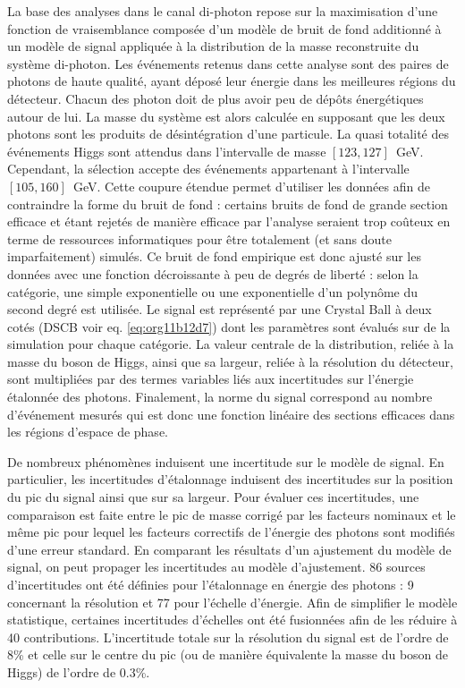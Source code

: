 La base des analyses dans le canal di-photon repose sur la maximisation d'une fonction de vraisemblance composée d'un modèle de bruit de fond additionné à un modèle de signal appliquée à la distribution de la masse reconstruite du système di-photon.
Les événements retenus dans cette analyse sont des paires de photons de haute qualité, ayant déposé leur énergie dans les meilleures régions du détecteur.
Chacun des photon doit de plus avoir peu de dépôts énergétiques autour de lui.
La masse du système est alors calculée en supposant que les deux photons sont les produits de désintégration d'une particule.
La quasi totalité des événements Higgs sont attendus dans l'intervalle de masse $[123, 127]$~GeV.
Cependant, la sélection accepte des événements appartenant à l'intervalle $[105, 160]$~GeV.
Cette coupure étendue permet d'utiliser les données afin de contraindre la forme du bruit de fond : certains bruits de fond de grande section efficace et étant rejetés de manière efficace par l'analyse seraient trop coûteux en terme de ressources informatiques pour être totalement (et sans doute imparfaitement) simulés.
Ce bruit de fond empirique est donc ajusté sur les données avec une fonction décroissante à peu de degrés de liberté : selon la catégorie, une simple exponentielle ou une exponentielle d'un polynôme du second degré est utilisée.
Le signal est représenté par une Crystal Ball à deux cotés (DSCB voir eq. \ref{eq:org11b12d7}) dont les paramètres sont évalués sur de la simulation pour chaque catégorie.
La valeur centrale de la distribution, reliée à la masse du boson de Higgs, ainsi que sa largeur, reliée à la résolution du détecteur, sont multipliées par des termes variables liés aux incertitudes sur l'énergie étalonnée des photons.
Finalement, la norme du signal correspond au nombre d'événement mesurés qui est donc une fonction linéaire des sections efficaces dans les régions d'espace de phase.

De nombreux phénomènes induisent une incertitude sur le modèle de signal.
En particulier, les incertitudes d'étalonnage induisent des incertitudes sur la position du pic du signal ainsi que sur sa largeur.
Pour évaluer ces incertitudes, une comparaison est faite entre le pic de masse corrigé par les facteurs nominaux et le même pic pour lequel les facteurs correctifs de l'énergie des photons sont modifiés d'une erreur standard.
En comparant les résultats d'un ajustement du modèle de signal, on peut propager les incertitudes au modèle d'ajustement.
86 sources d'incertitudes ont été définies pour l'étalonnage en énergie des photons : 9 concernant la résolution et 77 pour l'échelle d'énergie.
Afin de simplifier le modèle statistique, certaines incertitudes d'échelles ont été fusionnées afin de les réduire à 40 contributions.
L'incertitude totale sur la résolution du signal est de l'ordre de 8\% et celle sur le centre du pic (ou de manière équivalente la masse du boson de Higgs) de l'ordre de 0.3\%.

